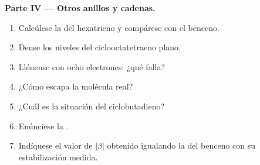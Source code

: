 \begin{problem}
\medskip
\noindent\textbf{Parte IV --- Otros anillos y cadenas.}
\begin{enumerate}[resume]
  \item Calcúlese la  del hexatrieno y compárese con el benceno.
  \item Dense los niveles del ciclooctatetraeno plano.
  \item Llénense con ocho electrones: ¿qué falla?
  \item ¿Cómo escapa la molécula real?
  \item ¿Cuál es la situación del ciclobutadieno?
  \item Enúnciese la .
  \item Indíquese el valor de $|\beta|$ obtenido igualando la  del benceno
        con su estabilización medida.
\end{enumerate}
\end{problem}
